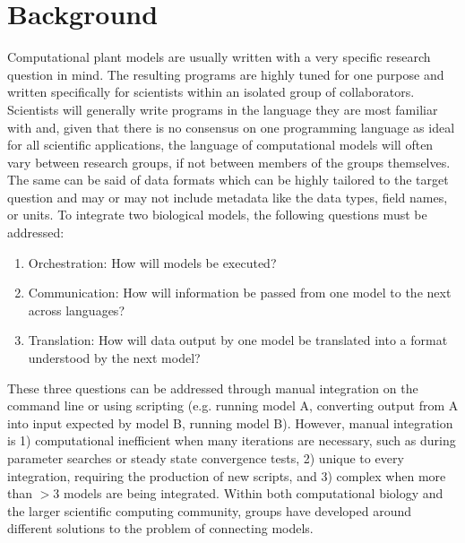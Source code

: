 \documentclass[journal]{IEEEtran}
\begin{document}
\section{Background}\label{S:background}
%
Computational plant models are usually written with a very specific research question in mind. The resulting programs are highly tuned for one purpose and written specifically for scientists within an isolated group of collaborators. Scientists will generally write programs in the language they are most familiar with and, given that there is no consensus on one programming language as ideal for all scientific applications, the language of computational models will often vary between research groups, if not between members of the groups themselves. The same can be said of data formats which can be highly tailored to the target question and may or may not include metadata like the data types, field names, or units. To integrate two biological models, the following questions must be addressed:
%
\begin{enumerate}
	\item Orchestration: How will models be executed?
	\item Communication: How will information be passed from one model to the next across languages?
	\item Translation: How will data output by one model be translated into a format understood by the next model?
\end{enumerate}

These three questions can be addressed through manual integration on the command line or using scripting (e.g. running model A, converting output from A into input expected by model B, running model B). However, manual integration is 1) computational inefficient when many iterations are necessary, such as during parameter searches or steady state convergence tests, 2) unique to every integration, requiring the production of new scripts, and 3) complex when more than $>3$ models are being integrated. Within both computational biology and the larger scientific computing community, groups have developed around different solutions to the problem of connecting models.

\end{document}
